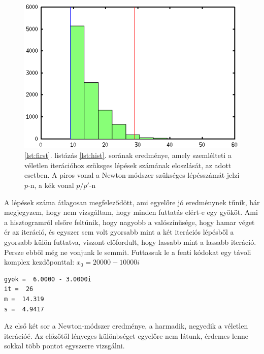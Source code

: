 \documentclass[a4paper,12pt]{report}
\begin{document}
				\begin{figure}[h]
					\centering
					\includegraphics[scale=0.65]{kepek/hist.png}
					\caption{\ref{lst:first}. listázás \ref{lst:hist}. sorának eredménye, amely szemlélteti a véletlen iterációhoz szüksges lépések számának eloszlását, az adott esetben. A piros vonal a Newton-módszer szükséges lépésszámát jelzi $p$-n, a kék vonal $p/p'$-n}\label{k11}
				\end{figure}

A lépések száma átlagosan megfeleződött, ami egyelőre jó eredménynek tűnik, bár megjegyzem, hogy nem vizsgáltam, hogy minden futtatás elért-e egy gyököt. Ami a hisztogramról elsőre feltűnik, hogy nagyobb a valószínűsége, hogy hamar véget ér az iteráció, és egyszer sem volt gyorsabb mint a két iterációs lépésből a gyorsabb külön futtatva, viszont előfordult, hogy lassabb mint a lassabb iteráció. Persze ebből még ne vonjunk le semmit. Futtassuk le a fenti kódokat egy távoli komplex kezdőponttal: $x_0=20000-10000i$
				\begin{singlespace}
                \begin{lstlisting}[caption=Eredmény]
gyok =  6.0000 - 3.0000i
it =  26
m =  14.319
s =  4.9417
				\end{lstlisting}
                \end{singlespace}
				Az első két sor a Newton-módszer eredménye, a harmadik, negyedik a véletlen iterációé. Az előzőtől lényeges különbséget egyelőre nem látunk, érdemes lenne sokkal több pontot egyszerre vizsgálni.
\end{document}
